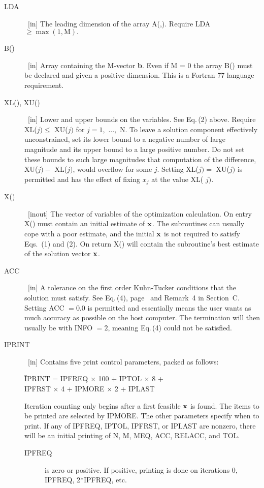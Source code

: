 \documentclass[twoside]{MATH77}
\begin{document}
\begin{description}
\item[LDA]  \ [in] The leading dimension of the array A(,). Require LDA $\geq
\max (1,\text{M}).$

\item[B()]  \ [in] Array containing the M-vector {\bf b}. Even if M = 0 the
array B() must be declared and given a positive dimension. This is a Fortran
77 language requirement.

\item[XL(), XU()]  \ [in] Lower and upper bounds on the variables. See
Eq.\,(2) above. Require XL($j)\leq $ XU($j)$ for $j=1$,\ ...,\ N. To
leave a solution component effectively unconstrained, set its lower bound to
a negative number of large magnitude and its upper bound to a large positive
number. Do not set these bounds to such large magnitudes that computation of
the difference, XU($j)-$ XL($j)$, would overflow for some $j$. Setting XL($%
j)=$ XU($j)$ is permitted and has the effect of fixing $x_j$ at the value XL(%
$j).$

\item[X()]  \ [inout] The vector of variables of the optimization
calculation. On entry X() must contain an initial estimate of ${\bf x}$. The
subroutines can usually cope with a poor estimate, and the initial ${\bf x}$
is not required to satisfy Eqs.~(1) and (2). On return X() will contain the
subroutine's best estimate of the solution vector ${\bf x}$.

\item[ACC]  \ [in] A tolerance on the first order Kuhn-Tucker
conditions that the solution must satisfy. See Eq.\,(4),
page~\pageref{O4} and Remark~4 in Section~C.  Setting ACC $=0.0$ is
permitted and essentially means the user wants as much accuracy as
possible on the host computer. The termination will then usually be
with INFO $=2$, meaning Eq.\,(4) could not be satisfied.

\item[IPRINT]  \ [in] Contains five print control parameters, packed as
follows:
\begin{tabbing}
\hspace{.2in}\=IPRINT = IPFREQ $\times $ 100 + IPTOL $\times $ 8 +\\
\>\quad IPFRST $\times $ 4 + IPMORE $\times $ 2 + IPLAST
\end{tabbing}

Iteration counting only begins after a first feasible ${\bf x}$ is found. The
items to be printed are selected by IPMORE. The other parameters specify
when to print. If any of IPFREQ, IPTOL, IPFRST, or IPLAST are nonzero, there
will be an initial printing of N, M, MEQ, ACC, RELACC, and TOL.
\begin{description}
\item[\rm IPFREQ] is zero or positive. If positive, printing is done on
iterations 0, IPFREQ, 2*IPFREQ, etc.


\end{description}
\end{description}
\end{document}
